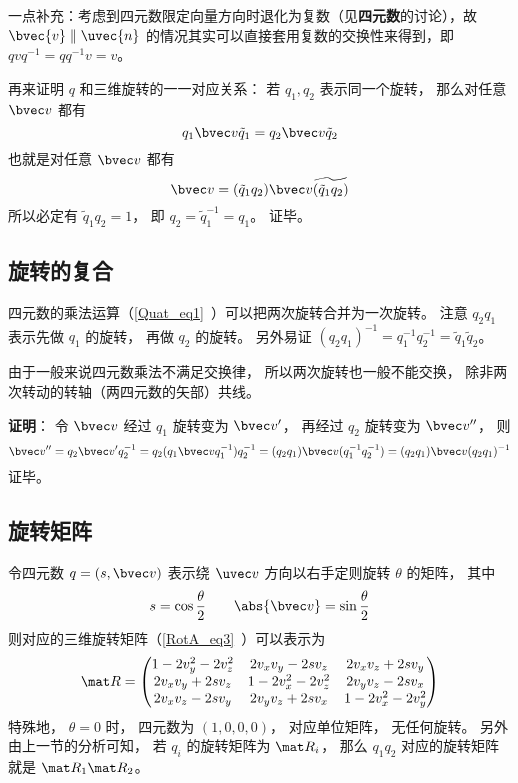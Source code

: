 一点补充：考虑到四元数限定向量方向时退化为复数（见\textbf{四元数}的讨论），故 $\bvec{v}\parallel{\uvec{n}}$ 的情况其实可以直接套用复数的交换性来得到，即 $qvq^{-1}=qq^{-1}v=v$。

再来证明 $q$ 和三维旋转的一一对应关系： 若 $q_1,q_2$ 表示同一个旋转， 那么对任意 $\bvec v$ 都有
\begin{equation}
q_1\bvec v \tilde q_1 = q_2\bvec v \tilde q_2
\end{equation}
也就是对任意 $\bvec v$ 都有
\begin{equation}
\bvec v = (\tilde q_1q_2)\bvec v \widetilde{(\tilde q_1q_2)}
\end{equation}
所以必定有 $\tilde q_1q_2 = 1$， 即 $q_2 = \tilde q_1^{-1} = q_1$。 证毕。

\subsection{旋转的复合}
四元数的乘法运算（\autoref{Quat_eq1}~）可以把两次旋转合并为一次旋转。 注意 $q_2q_1$ 表示先做 $q_1$ 的旋转， 再做 $q_2$ 的旋转。 另外易证 $(q_2q_1)^{-1} = q_1^{-1} q_2^{-1} = \tilde q_1\tilde q_2$。

由于一般来说四元数乘法不满足交换律， 所以两次旋转也一般不能交换， 除非两次转动的转轴（两四元数的矢部）共线。

\textbf{证明}： 令 $\bvec v$ 经过 $q_1$ 旋转变为 $\bvec v'$， 再经过 $q_2$ 旋转变为 $\bvec v''$， 则
\begin{equation}
\bvec v'' = q_2\bvec v'q_2^{-1} = q_2(q_1\bvec vq_1^{-1}) q_2^{-1} = (q_2q_1)\bvec v(q_1^{-1} q_2^{-1}) = (q_2q_1)\bvec v(q_2q_1)^{-1}
\end{equation}
证毕。

\subsection{旋转矩阵}
令四元数 $q = (s, \bvec v)$ 表示绕 $\uvec v$ 方向以右手定则旋转 $\theta$ 的矩阵， 其中
\begin{equation}
s = \cos\frac{\theta}{2} \qquad
\abs{\bvec v} = \sin\frac{\theta}{2}
\end{equation}
则对应的三维旋转矩阵（\autoref{RotA_eq3}~）可以表示为
\begin{equation}\label{QuatN_eq2}
\mat R =
\begin{pmatrix}
1 - 2v_y^2 - 2v_z^2 & 2v_xv_y - 2sv_z  & 2v_x v_z + 2s v_y\\
2v_x v_y + 2sv_z & 1 - 2v_x^2 - 2v_z^2 & 2v_y v_z - 2s v_x\\
2v_x v_z - 2s v_y & 2v_y v_z + 2s v_x & 1 - 2v_x^2 - 2v_y^2
\end{pmatrix}
\end{equation}
特殊地， $\theta = 0$ 时， 四元数为 $(1,0,0,0)$， 对应单位矩阵， 无任何旋转。 另外由上一节的分析可知， 若 $q_i$ 的旋转矩阵为 $\mat R_i$， 那么 $q_1q_2$ 对应的旋转矩阵就是 $\mat R_1\mat R_2$。

